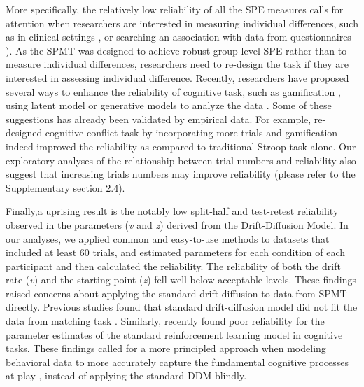 \documentclass[sn-apa]{sn-jnl}%
\theoremstyle{thmstyleone}%
\theoremstyle{thmstyletwo}%
\theoremstyle{thmstylethree}%
\begin{document}
More specifically, the relatively low reliability of all the SPE measures calls for attention when researchers are interested in measuring individual differences, such as in clinical settings \parencite[e.g.,] []{karvelis2023individual}, or searching an association with data from questionnaires \parencite{hedge2018reliability}). As the SPMT was designed to achieve robust group-level SPE rather than to measure individual differences, researchers need to re-design the task if they are interested in assessing individual difference. Recently, researchers have proposed several ways to enhance the reliability of cognitive task, such as gamification \parencite{friehs2020effective}, using latent model \parencite{enkavi2019large, eisenberg2019uncovering} or generative models \parencite{haines2020theoretically} to analyze the data . Some of these suggestions has already been validated by empirical data. For example, \textcite{kucina2023calibration} re-designed cognitive conflict task by incorporating more trials and gamification indeed improved the reliability as compared to traditional Stroop task alone. Our exploratory analyses of the relationship between trial numbers and reliability also suggest that increasing trials numbers may improve reliability (please refer to the Supplementary section 2.4). 

Finally,a uprising result is the notably low split-half and test-retest reliability observed in the parameters (\textit{v} and \textit{z}) derived from the Drift-Diffusion Model. In our analyses, we applied common and easy-to-use methods to datasets that included at least 60 trials, and estimated parameters for each condition of each participant and then calculated the reliability. The reliability of both the drift rate (\textit{v}) and the starting point (\textit{z}) fell well below acceptable levels. These findings raised concerns about applying the standard drift-diffusion to data from SPMT directly. Previous studies found that standard drift-diffusion model did not fit the data from matching task \parencite{groulx2020ez}. Similarly, \textcite{schaaf2023test} recently found poor reliability for the parameter estimates of the standard reinforcement learning model in cognitive tasks. These findings called for a more principled approach when modeling behavioral data to more accurately capture the fundamental cognitive processes at play \parencite[e.g.,][]{wilson2019ten}, instead of applying the standard DDM blindly.  
\end{document}
